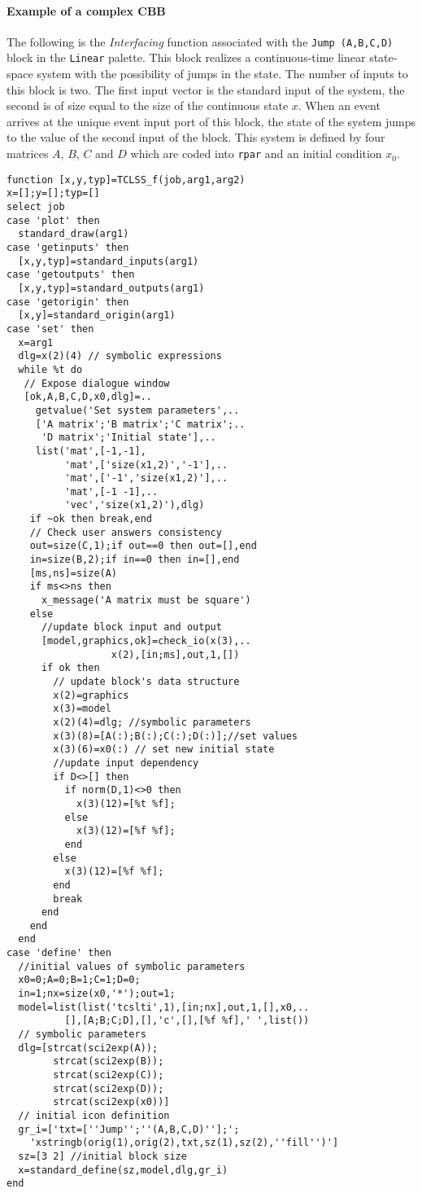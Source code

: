 \documentclass{book}
\newcommand{\interfacing}{{\em Interfacing }}
\begin{document}
\paragraph{Example of a complex CBB}
The following is the \interfacing function associated with
the {\tt Jump (A,B,C,D)} block in the {\tt Linear} palette.   
This block realizes a continuous-time linear
state-space system with the possibility of jumps in the state. The
number of inputs to this block is two. The first input vector is the
standard input of the system, the second is of size equal to the size
of the continuous state $x$. When an event arrives at the unique event
input port of this block, the state of the system jumps to the value
of the second input of the block.  This system is defined by  four
matrices $A$, $B$, $C$ and $D$ which are coded into {\tt rpar} and an
initial condition $x_0$.
\label{dlg1}
\begin{verbatim}
function [x,y,typ]=TCLSS_f(job,arg1,arg2)
x=[];y=[];typ=[]
select job
case 'plot' then
  standard_draw(arg1)
case 'getinputs' then
  [x,y,typ]=standard_inputs(arg1)
case 'getoutputs' then
  [x,y,typ]=standard_outputs(arg1)
case 'getorigin' then
  [x,y]=standard_origin(arg1)
case 'set' then
  x=arg1
  dlg=x(2)(4) // symbolic expressions
  while %t do
   // Expose dialogue window
   [ok,A,B,C,D,x0,dlg]=..
     getvalue('Set system parameters',..
     ['A matrix';'B matrix';'C matrix';..
      'D matrix';'Initial state'],..
     list('mat',[-1,-1],
          'mat',['size(x1,2)','-1'],..
          'mat',['-1','size(x1,2)'],..
          'mat',[-1 -1],..
          'vec','size(x1,2)'),dlg)
    if ~ok then break,end
    // Check user answers consistency
    out=size(C,1);if out==0 then out=[],end
    in=size(B,2);if in==0 then in=[],end
    [ms,ns]=size(A)
    if ms<>ns then
      x_message('A matrix must be square')
    else
      //update block input and output
      [model,graphics,ok]=check_io(x(3),..
                  x(2),[in;ms],out,1,[])
      if ok then
        // update block's data structure 
        x(2)=graphics
        x(3)=model
        x(2)(4)=dlg; //symbolic parameters 
        x(3)(8)=[A(:);B(:);C(:);D(:)];//set values
        x(3)(6)=x0(:) // set new initial state
        //update input dependency
        if D<>[] then   
          if norm(D,1)<>0 then
            x(3)(12)=[%t %f];
          else
            x(3)(12)=[%f %f];
          end
        else
          x(3)(12)=[%f %f];
        end
        break
      end
    end
  end
case 'define' then
  //initial values of symbolic parameters
  x0=0;A=0;B=1;C=1;D=0; 
  in=1;nx=size(x0,'*');out=1;
  model=list(list('tcslti',1),[in;nx],out,1,[],x0,..
          [],[A;B;C;D],[],'c',[],[%f %f],' ',list())
  // symbolic parameters 
  dlg=[strcat(sci2exp(A));
        strcat(sci2exp(B));
        strcat(sci2exp(C));
        strcat(sci2exp(D));
        strcat(sci2exp(x0))]
  // initial icon definition
  gr_i=['txt=[''Jump'';''(A,B,C,D)''];';
    'xstringb(orig(1),orig(2),txt,sz(1),sz(2),''fill'')']
  sz=[3 2] //initial block size
  x=standard_define(sz,model,dlg,gr_i)
end
\end{verbatim}
\end{document}
